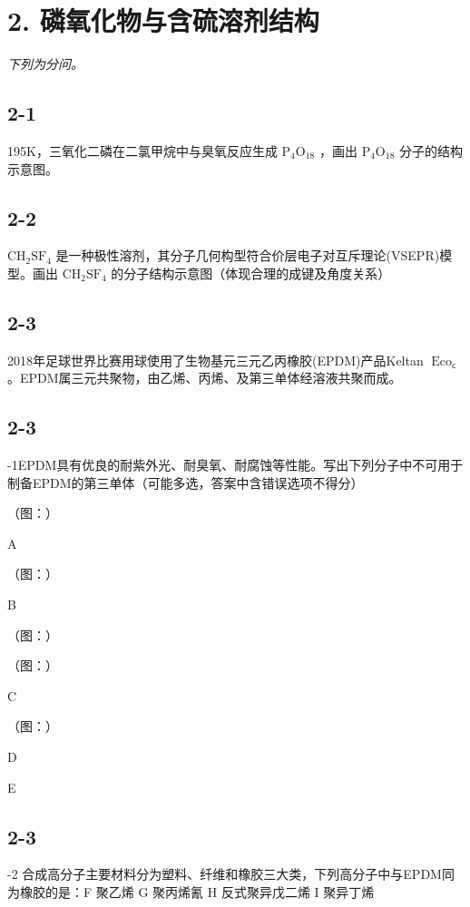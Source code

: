 \section*{2. 磷氧化物与含硫溶剂结构}
\textit{下列为分问。}

\subsection*{2-1}
195K，三氧化⼆磷在⼆氯甲烷中与臭氧反应⽣成 $\mathrm { P _ { 4 } O _ { 1 8 } }$ ，画出 $\mathrm { P _ { 4 } O _ { 1 8 } }$ 分⼦的结构⽰意图。

\subsection*{2-2}
$\mathrm { C H _ { 2 } S F _ { 4 } }$ 是⼀种极性溶剂，其分⼦⼏何构型符合价层电⼦对互斥理论(VSEPR)模型。画出 $\mathrm { C H _ { 2 } S F _ { 4 } }$ 的分⼦结构⽰意图（体现合理的成键及⻆度关系）

\subsection*{2-3}
2018年⾜球世界⽐赛⽤球使⽤了⽣物基元三元⼄丙橡胶(EPDM)产品Keltan $\operatorname { E c o } _ { \mathsf { c } }$ 。EPDM属三元共聚物，由⼄烯、丙烯、及第三单体经溶液共聚⽽成。

\subsection*{2-3}
-1EPDM具有优良的耐紫外光、耐臭氧、耐腐蚀等性能。写出下列分⼦中不可⽤于制备EPDM的第三单体（可能多选，答案中含错误选项不得分）

（图：）

A

（图：）

B

（图：）

（图：）

C

（图：）

D

E

\subsection*{2-3}
-2 合成⾼分⼦主要材料分为塑料、纤维和橡胶三⼤类，下列⾼分⼦中与EPDM同为橡胶的是：F 聚⼄烯 G 聚丙烯氰 H 反式聚异戊⼆烯 I 聚异丁烯
